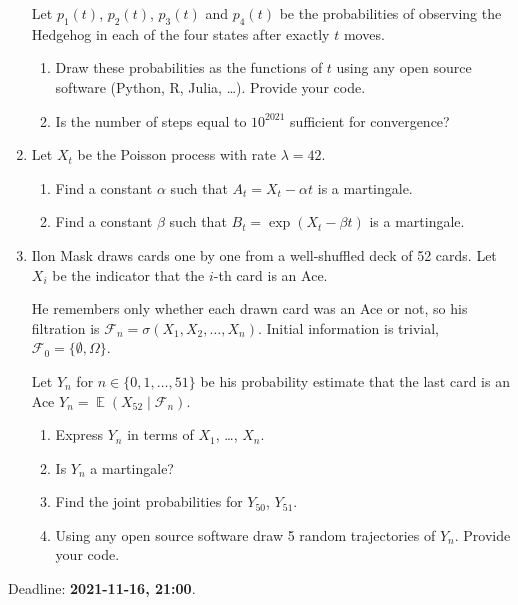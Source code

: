 \documentclass[12pt]{article}
\DeclareMathOperator{\E}{\mathbb{E}}
\begin{document}
\begin{enumerate}
  Let $p_1(t)$, $p_2(t)$, $p_3(t)$ and $p_4(t)$ be the probabilities of 
  observing the Hedgehog in each of the four states after exactly $t$ moves. 

  \begin{enumerate}
    \item Draw these probabilities as the functions of $t$ using any open source software (Python, R, Julia, \ldots).
    Provide your code.  
    \item Is the number of steps equal to $10^{2021}$ sufficient for convergence?
  \end{enumerate}
  
  \item Let $X_t$ be the Poisson process with rate $\lambda = 42$. 
  \begin{enumerate}
    \item Find a constant $\alpha$ such that $A_t = X_t - \alpha t$ is a martingale.
    \item Find a constant $\beta$ such that $B_t = \exp(X_t - \beta t)$ is a martingale.
  \end{enumerate}

\item Ilon Mask draws cards one by one from a well-shuffled deck of 52 cards. 
Let $X_i$ be the indicator that the $i$-th card is an Ace. 

He remembers only whether each drawn card was an Ace or not, so 
his filtration is $\mathcal F_n = \sigma(X_1, X_2, \ldots, X_n)$.
Initial information is trivial, $\mathcal F_0 = \{\emptyset, \Omega\}$.

Let $Y_n$ for $n \in \{0, 1, \ldots, 51\}$ be his probability estimate that the last card is an Ace $Y_n = \E(X_{52} \mid \mathcal F_n)$.

\begin{enumerate}
  \item Express $Y_n$ in terms of $X_1$, \ldots, $X_n$.
  \item Is $Y_n$ a martingale?
  \item Find the joint probabilities for $Y_{50}$, $Y_{51}$.
  \item Using any open source software draw 5 random trajectories of $Y_n$. Provide your code. 
\end{enumerate}





\end{enumerate}


Deadline: \textbf{2021-11-16, 21:00}. 
\end{document}
